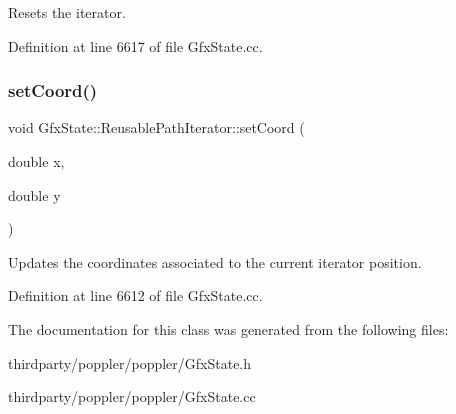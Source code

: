 Resets the iterator. 

Definition at line 6617 of file Gfx\+State.\+cc.

\mbox{\label{class_gfx_state_1_1_reusable_path_iterator_af4e893977b96e25d14e64d93bb8a76f1}} 
\subsubsection{\texorpdfstring{set\+Coord()}{setCoord()}}
{\footnotesize\ttfamily void Gfx\+State\+::\+Reusable\+Path\+Iterator\+::set\+Coord (\begin{DoxyParamCaption}\item[{double}]{x,  }\item[{double}]{y }\end{DoxyParamCaption})}

Updates the coordinates associated to the current iterator position. 

Definition at line 6612 of file Gfx\+State.\+cc.



The documentation for this class was generated from the following files\+:\begin{DoxyCompactItemize}
\item 
thirdparty/poppler/poppler/Gfx\+State.\+h\item 
thirdparty/poppler/poppler/Gfx\+State.\+cc\end{DoxyCompactItemize}
